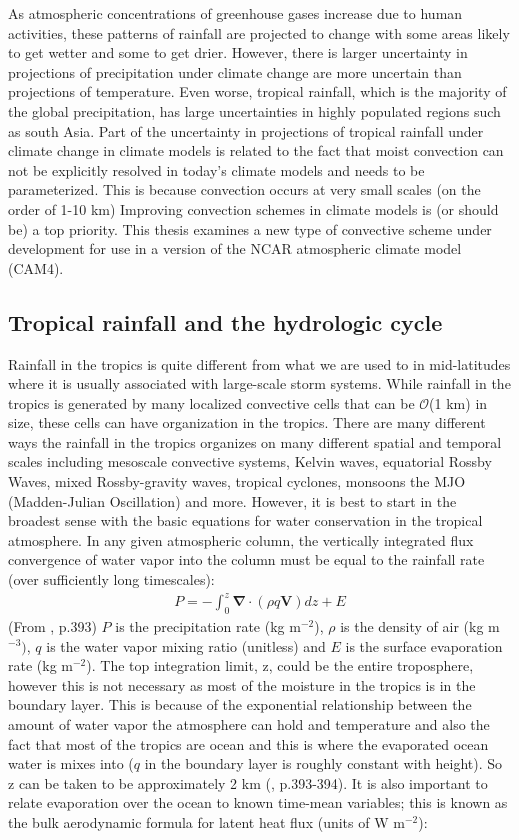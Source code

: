 \documentclass[letterpaper,12pt,titlepage,oneside,final]{book}
\begin{document}
As atmospheric concentrations of greenhouse gases increase due to human activities, these patterns of rainfall are projected to change with some areas likely to get wetter and some to get drier. However, there is larger uncertainty in projections of precipitation under climate change are more uncertain than projections of temperature. Even worse, tropical rainfall, which is the majority of the global precipitation, has large uncertainties in highly populated regions such as south Asia. Part of the uncertainty in projections of tropical rainfall under climate change in climate models is related to the fact that moist convection can not be explicitly resolved in today's climate models and needs to be parameterized. This is because convection occurs at very small scales (on the order of 1-10 km) Improving convection schemes in climate models is (or should be) a top priority. This thesis examines a new type of convective scheme under development for use in a version of the NCAR atmospheric climate model (CAM4).
\subsection{Tropical rainfall and the hydrologic cycle}
Rainfall in the tropics is quite different from what we are used to in mid-latitudes where it is usually associated with large-scale storm systems. While rainfall in the tropics is generated by many localized convective cells that can be $\mathcal{O}$(1 km) in size, these cells can have organization in the tropics. There are many different ways the rainfall in the tropics organizes on many different spatial and temporal scales including mesoscale convective systems, Kelvin waves, equatorial Rossby Waves, mixed Rossby-gravity waves, tropical cyclones, monsoons the MJO (Madden-Julian Oscillation) and more. However, it is best to start in the broadest sense with the basic equations for water conservation in the tropical atmosphere. In any given atmospheric column, the vertically integrated flux convergence of water vapor into the column must be equal to the rainfall rate (over sufficiently long timescales):
\begin{align}
P=-\int_{0}^{z}\mathbf{\nabla}\cdot(\rho{q}\mathbf{V})dz+E
\end{align}
(From \citep{holton_introduction_2004}, p.393)
$P$ is the precipitation rate (kg m$^{-2}$), $\rho$ is the density of air (kg m$^{-3})$, $q$ is the water vapor mixing ratio (unitless) and $E$ is the surface evaporation rate (kg m$^{-2}$). The top integration limit, z, could be the entire troposphere, however this is not necessary as most of the moisture in the tropics is in the boundary layer. This is because of the exponential relationship between the amount of water vapor the atmosphere can hold and temperature and also the fact that most of the tropics are ocean and this is where the evaporated ocean water is mixes into ($q$ in the boundary layer is roughly constant with height). So z can be taken to be approximately 2 km (\citep{holton_introduction_2004}, p.393-394). It is also important to relate evaporation over the ocean to known time-mean variables; this is known as the bulk aerodynamic formula for latent heat flux (units of W m$^{-2}$):
\end{document}
